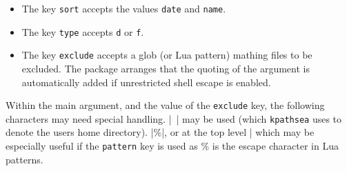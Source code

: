 \documentclass{l3doc}
\begin{document}
\begin{documentation}
\begin{function}
\begin{itemize}
 \item
 The key \texttt{sort} accepts the values \texttt{date} and \texttt{name}.

 \item
 The key \texttt{type} accepts \texttt{d} or \texttt{f}.

 \item
 The key \texttt{exclude} accepts a glob (or Lua pattern) mathing
 files to be excluded.  The package arranges that the quoting of the
 argument is automatically added if unrestricted shell escape is
 enabled.

\end{itemize}

 Within the main  argument, and the value of the \texttt{exclude} key,
 the following characters may need special handling.
 |~| may be used (which \texttt{kpathsea} uses to denote the users home directory).
 |\%|, or at the top level |%
 which may be especially useful if the \texttt{pattern} key is used
 as \% is the escape character in Lua patterns.
 
 

\end{function}

\end{documentation}

\PrintIndex
\end{document}
